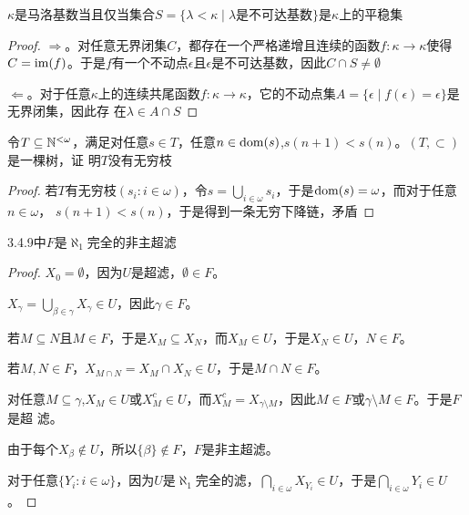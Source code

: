 \documentclass[11pt]{article}
\begin{document}
\begin{exercise}
\(\kappa\)是马洛基数当且仅当集合\(S=\{\lambda<\kappa\mid\lambda\text{是不可达基数}\}\)是\(\kappa\)上的平稳集
\end{exercise}

\begin{proof}
\(\Rightarrow\)。对任意无界闭集\(C\)，都存在一个严格递增且连续的函数\(f:\kappa\to\kappa\)使得\(C=\operatorname{im}(f)\)。于是\(f\)有一个不动点\(\epsilon\)且\(\epsilon\)是不可达基数，因此\(C\cap S\neq\emptyset\)

\(\Leftarrow\)。对于任意\(\kappa\)上的连续共尾函数\(f:\kappa\to\kappa\)，它的不动点集\(A=\{\epsilon\mid f(\epsilon)=\epsilon\}\)是无界闭集，因此存
在\(\lambda\in A\cap S\)
\end{proof}

\begin{exercise}
令\(T\subseteq\mathbb{N}^{<\omega}\)，满足对任意\(s\in T\)，任意\(n\in\operatorname{dom}(s)\),\(s(n+1)<s(n)\)。\((T,\subset)\)是一棵树，证
明\(T\)没有无穷枝
\end{exercise}

\begin{proof}
若\(T\)有无穷枝\((s_i:i\in\omega)\)，令\(s=\bigcup_{i\in\omega} s_i\)，于是\(\operatorname{dom}(s)=\omega\)，而对于任意\(n\in\omega\)，
\(s(n+1)<s(n)\)，于是得到一条无穷下降链，矛盾
\end{proof}

\begin{exercise}
3.4.9中\(F\)是\(\aleph_1\)完全的非主超滤
\end{exercise}

\begin{proof}
\(X_0=\emptyset\)，因为\(U\)是超滤，\(\emptyset\in F\)。

\(X_\gamma=\bigcup_{\beta\in\gamma}X_\gamma\in U\)，因此\(\gamma\in F\)。

若\(M\subseteq N\)且\(M\in F\)，于是\(X_M\subseteq X_N\)，而\(X_M\in U\)，于是\(X_N\in U\)，\(N\in F\)。

若\(M,N\in F\)，\(X_{M\cap N}=X_M\cap X_N\in U\)，于是\(M\cap N\in F\)。

对任意\(M\subseteq\gamma\),\(X_M\in U\)或\(X_M^c\in U\)，而\(X_M^c=X_{\gamma\setminus M}\)，因此\(M\in F\)或\(\gamma\setminus M\in F\)。于是\(F\)是超
滤。

由于每个\(X_\beta\notin U\)，所以\(\{\beta\}\notin F\)，\(F\)是非主超滤。

对于任意\(\{Y_i:i\in\omega\}\)，因为\(U\)是\(\aleph_1\)完全的滤，\(\bigcap_{i\in\omega}X_{Y_i}\in U\)，于是\(\bigcap_{i\in\omega}Y_i\in U\)。
\end{proof}
\end{document}
